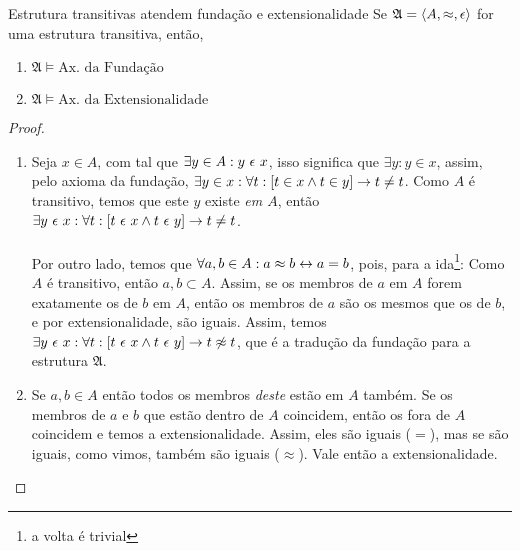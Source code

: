         \begin{theorem}{Estrutura transitivas atendem fundação e extensionalidade}
            Se $\mathfrak{A} = \TUPLE{A}{\approx}{\epsilon}$ for uma estrutura transitiva, então,
            \begin{enumerate}[label=\alph*)]
                \item $\mathfrak{A}\vDash\text{Ax. da Fundação}$
                \item $\mathfrak{A}\vDash\text{Ax. da Extensionalidade}$
            \end{enumerate}
            \begin{proof}
                \begin{enumerate}[label=\alph*)]
                    \item
                        Seja $x\in A$, com tal que $\exists y\in A: y\text{ }\epsilon\text{ } x$, 
                        isso significa que $\exists y: y\in x$, assim, pelo axioma da fundação, 
                        $\exists y\in x:\forall t: [t\in x\land t\in y]\rightarrow t\not = t$. Como $A$ é 
                        transitivo, temos que este $y$ existe \emph{em $A$}, então 
                        $\exists y\text{ }\epsilon\text{ } x:\forall t: [t\text{ }\epsilon\text{ } x\land t\text{ }\epsilon\text{ } y]\rightarrow t\not = t$.
                    \paragraph{}
                        Por outro lado, temos que $\forall a,b\in A:a\approx b \leftrightarrow a = b$, pois, para
                        a ida\footnote{a volta é trivial}: Como $A$ é transitivo, então $a,b\subset A$. Assim, se os membros de $a$ 
                        em $A$ forem exatamente os de $b$ em $A$, então os membros de $a$ são os mesmos
                        que os de $b$, e por extensionalidade, são iguais. Assim, temos
                        $\exists y\text{ }\epsilon\text{ } x:\forall t: [t\text{ }\epsilon\text{ } x\land t\text{ }\epsilon\text{ } y]\rightarrow t\not \approx t$,
                        que é a tradução da fundação para a estrutura $\mathfrak{A}$.
                    \item
                        Se $a,b\in A$ então todos os membros \emph{deste} estão em $A$ também. Se os membros 
                        de $a$ e $b$ que estão dentro de $A$ coincidem, então os fora de $A$ coincidem e 
                        temos a extensionalidade. Assim, eles são iguais ($=$), mas se são iguais, como vimos,
                        também são iguais ($\approx$). Vale então a extensionalidade.
                \end{enumerate}
            \end{proof}\eop
        \end{theorem}
